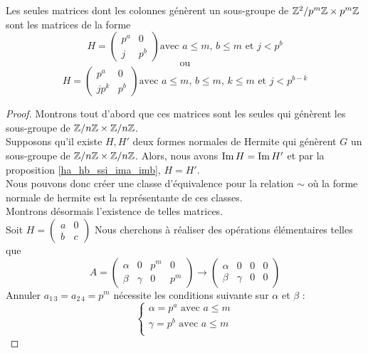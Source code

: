 \documentclass[12pt]{article}
\newcommand*{\pmZpmZ }{p^m\Z \x p^m\Z}
\newcommand*{\ZZpmZ}{\Z^2/\pmZpmZ}
\begin{document}
\begin{theorem}
	Les seules matrices dont les colonnes génèrent un sous-groupe de $\ZZpmZ$
	sont les matrices de la forme
	$$H =
		\begin{pmatrix}
			p^a & 0   \\
			j   & p^b
		\end{pmatrix}
		\text{avec $a \le m$, $b \le m$ et $j < p^b$}
	$$
	$$ \text{ ou }$$
	$$ H =\begin{pmatrix}
			p^a  & 0   \\
			jp^k & p^b
		\end{pmatrix}
		\text{avec $a \le m$, $b \le m$, $k \le m$ et $j < p^{b - k}$}
	$$

\end{theorem}
\begin{proof}
	Montrons tout d'abord que ces matrices sont les seules qui génèrent les sous-groupe de $\ZZ$.\\
	Supposons qu'il existe $H,H'$ deux formes normales de Hermite qui génèrent $G$ un sous-groupe
	de $\ZZ$. Alors, nous avons $\im H = \im H'$ et par la proposition \ref{ha_hb_ssi_ima_imb}, $H = H'$.\\
	Nous pouvons donc créer une classe d'équivalence pour la relation $\sim$ où la forme normale
	de hermite est la représentante de ces classes.\\
	\newpage
	\noindent
	Montrons désormais l'existence de telles matrices.\\
	Soit
	$H = \begin{pmatrix}
			a & 0 \\
			b & c
		\end{pmatrix}$
	Nous cherchons à réaliser des opérations élémentaires telles que
	\begin{equation*}
		A = \begin{pmatrix}
			\alpha & 0      & p^m & 0   \\
			\beta  & \gamma & 0   & p^m
		\end{pmatrix}
		\longrightarrow
		\begin{pmatrix}
			\alpha & 0      & 0 & 0 \\
			\beta  & \gamma & 0 & 0
		\end{pmatrix}
	\end{equation*}
	Annuler $a_{1\,3} = a_{2\,4} = p^m$ nécessite les conditions suivante sur $\alpha$ et $\beta$ :
	$$\begin{cases*}
			\alpha = p^a \text{ avec } a \le m\\
			\gamma = p^b \text{ avec } a \le m\\

\end{cases*}$$
\end{proof}
\end{document}
